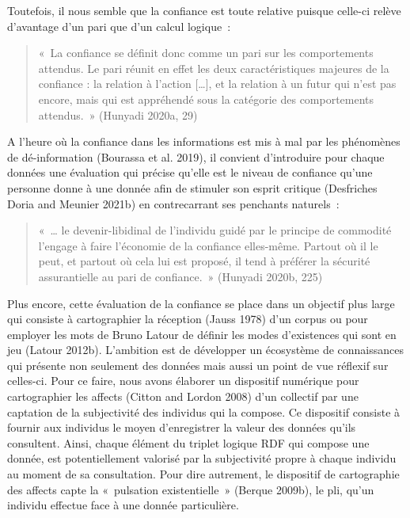 \documentclass[
  letterpaper,
  DIV=11,
  numbers=noendperiod]{scrreprt}
\begin{document}
Toutefois, il nous semble que la confiance est toute relative puisque
celle-ci relève d'avantage d'un pari que d'un calcul logique~:

\begin{quote}
«~La confiance se définit donc comme un pari sur les comportements
attendus. Le pari réunit en effet les deux caractéristiques majeures de
la confiance : la relation à l'action {[}\ldots{]}, et la relation à un
futur qui n'est pas encore, mais qui est appréhendé sous la catégorie
des comportements attendus.~» (Hunyadi 2020a, 29)
\end{quote}

A l'heure où la confiance dans les informations est mis à mal par les
phénomènes de dé-information (Bourassa et al. 2019), il convient
d'introduire pour chaque données une évaluation qui précise qu'elle est
le niveau de confiance qu'une personne donne à une donnée afin de
stimuler son esprit critique (Desfriches Doria and Meunier 2021b) en
contrecarrant ses penchants naturels~:

\begin{quote}
«~\ldots{} le devenir-libidinal de l'individu guidé par le principe de
commodité l'engage à faire l'économie de la confiance elles-même.
Partout où il le peut, et partout où cela lui est proposé, il tend à
préférer la sécurité assurantielle au pari de confiance.~» (Hunyadi
2020b, 225)
\end{quote}

Plus encore, cette évaluation de la confiance se place dans un objectif
plus large qui consiste à cartographier la réception (Jauss 1978) d'un
corpus ou pour employer les mots de Bruno Latour de définir les modes
d'existences qui sont en jeu (Latour 2012b). L'ambition est de
développer un écosystème de connaissances qui présente non seulement des
données mais aussi un point de vue réflexif sur celles-ci. Pour ce
faire, nous avons élaborer un dispositif numérique pour cartographier
les affects (Citton and Lordon 2008) d'un collectif par une captation de
la subjectivité des individus qui la compose. Ce dispositif consiste à
fournir aux individus le moyen d'enregistrer la valeur des données
qu'ils consultent. Ainsi, chaque élément du triplet logique RDF qui
compose une donnée, est potentiellement valorisé par la subjectivité
propre à chaque individu au moment de sa consultation. Pour dire
autrement, le dispositif de cartographie des affects capte la
«~pulsation existentielle~» (Berque 2009b), le pli, qu'un individu
effectue face à une donnée particulière.
\end{document}
